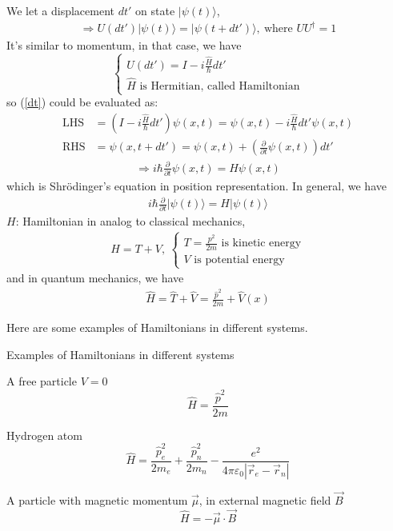 \documentclass[UTF8,12pt]{article} %
\begin{document}
We let a displacement $dt'$ on state $|\psi(t)\rangle$,
\begin{align}\label{dt}
\Rightarrow U(dt')|\psi(t)\rangle = |\psi(t+dt')\rangle,~\text{where } UU^{\dag} = 1
\end{align}
It's similar to momentum, in that case, we have
$$\begin{cases}U(dt') = I - i\frac{\hat{H}}{\hbar}dt'\\\hat{H} \text{ is Hermitian, called Hamiltonian}\end{cases}$$
so (\ref{dt}) could be evaluated as:
\begin{align}
\text{LHS} &= \left(I - i\frac{\hat{H}}{\hbar}dt'\right) \psi(x,t) = \psi(x,t) -  i\frac{\hat{H}}{\hbar}dt'\psi(x,t) \\
\text{RHS} &= \psi(x,t+dt') = \psi(x,t) + \left(\frac{\partial}{\partial t}\psi(x,t)\right)dt'
\end{align}
\begin{align}
\Rightarrow \boxed{i\hbar\frac{\partial}{\partial t} \psi(x,t) = H\psi(x,t)}
\end{align}
which is Shr\"{o}dinger's equation in position representation. In general, we have
\begin{align}\label{shordinger}
\boxed{i\hbar\frac{\partial}{\partial t} |\psi(t)\rangle = H|\psi(t)\rangle}
\end{align}
$H$: Hamiltonian in analog to classical mechanics,
\begin{align}
H = T + V,~ \begin{cases}T = \frac{p^{2}}{2m} \text{ is kinetic energy} \\ V \text{ is potential energy}\end{cases}
\end{align}
and in quantum mechanics, we have
\begin{align}
\hat{H} = \hat{T} + \hat{V} = \frac{\hat{p}^{2}}{2m} + \hat{V}(x)
\end{align}

Here are some examples of Hamiltonians in different systems.

\begin{myboxes}{Examples of Hamiltonians in different systems}{}
\begin{enumerate*}
\item A free particle $V=0$ $$\hat{H} = \frac{\hat{p}^{2}}{2m}$$
\item Hydrogen atom $$\hat{H} = \frac{\hat{p}_{e}^{2}}{2m_{e}} + \frac{\hat{p}_{n}^{2}}{2m_{n}} - \frac{e^{2}}{4\pi\varepsilon_{0}|\vec{r}_{e}-\vec{r}_{n}|}$$
\item A particle with magnetic momentum $\vec{\mu}$, in external magnetic field $\vec{B}$
$$\hat{H} = -\vec{\mu}\cdot\vec{B}$$
\end{enumerate*}
\end{myboxes}
\end{document}
